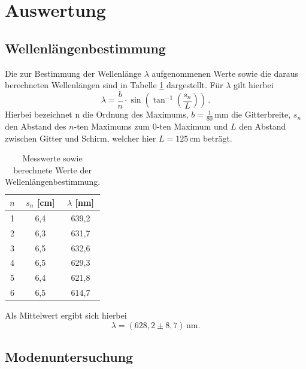 \section{Auswertung}
\subsection{Wellenlängenbestimmung}
Die zur Bestimmung der Wellenlänge $\lambda$ aufgenommenen Werte sowie die daraus berechneten Wellenlängen sind in Tabelle \ref{welltab} dargestellt. Für $\lambda$ gilt hierbei
\begin{equation}
  \lambda = \frac{b}{n}\cdot\sin\left(\tan^{-1}\left(\frac{s_n}{L}\right)\right) \, .
\end{equation}
Hierbei bezeichnet n die Ordnung des Maximums, $b=\frac{1}{80}\,\si{\milli\meter}$ die Gitterbreite, $s_n$ den Abstand des $n$-ten Maximums zum $0$-ten Maximum und $L$ den Abstand zwischen Gitter und Schirm,
welcher hier $L=125\,\si{\centi\meter}$ beträgt.
\begin{table}[H]
  \centering
\begin{tabular}{c|c|c}
$n$  & $s_n$ [cm]    & $\lambda$ [nm]     \\
\hline
1 & 6,4 & 639,2 \\
2 & 6,3 & 631,7 \\
3 & 6,5 & 632,6 \\
4 & 6,5 & 629,3 \\
5 & 6,4 & 621,8 \\
6 & 6,5 & 614,7
\end{tabular}
\caption{Messwerte sowie berechnete Werte der Wellenlängenbestimmung.}
\label{welltab}
\end{table}
Als Mittelwert ergibt sich hierbei
\begin{equation}
  \lambda= (628,2 \pm 8,7) \, \si{\nano\meter}.
\end{equation}
\subsection{Modenuntersuchung}
